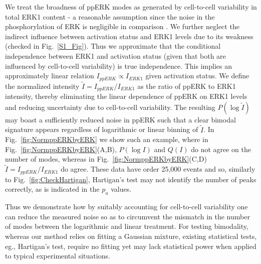 \documentclass[11pt,a4paper,final]{article}
\begin{document}
We treat the broadness of ppERK modes as generated by cell-to-cell variability in total ERK1 content - a reasonable assumption since the noise in the phosphorylation of ERK is negligible in comparison \cite{Filippi2016}. We further neglect the indirect influence between activation status and ERK1 levels due to its weakness (checked in Fig.~\ref{S1_Fig}). Thus we approximate that the conditional independence between ERK1 and activation status (given that both are influenced by cell-to-cell variability) is true independence. This implies an approximately linear relation $I_{ppERK} \propto I_{ERK1}$ given activation status.
We define the normalized intensity $\tilde{I} = I_{ppERK}/I_{ERK1}$ as the ratio of ppERK to ERK1 intensity, thereby eliminating the linear dependence of ppERK on ERK1 levels and reducing uncertainty due to cell-to-cell variability. The resulting $P(\log \tilde{I})$ may boast a sufficiently reduced noise in ppERK such that a clear bimodal signature appears regardless of logarithmic or linear binning of $\tilde{I}$. In Fig.~\ref{fig:NormppERKbyERK} we show such an example, where in Fig.~\ref{fig:NormppERKbyERK}(A,B), $P(\log I)$ and $Q(I)$ do not agree on the number of modes, whereas in Fig.~\ref{fig:NormppERKbyERK}(C,D) $\tilde{I} = I_{ppERK} / I_{ERK1}$ do agree. These data have order 25,000 events and so, similarly to Fig.~\ref{fig:CheckHartigan}, Hartigan's test may not identify the number of peaks correctly, as is indicated in the $p_u$ values.

Thus we demonstrate how by suitably accounting for cell-to-cell variability one can reduce the measured noise so as to circumvent the mismatch in the number of modes between the logarithmic and linear treatment. For testing bimodality, whereas our method relies on fitting a Gaussian mixture, existing statistical tests, eg., Hartigan's test, require no fitting yet may lack statistical power when applied to typical experimental situations. 
\smallskip
\end{document}
